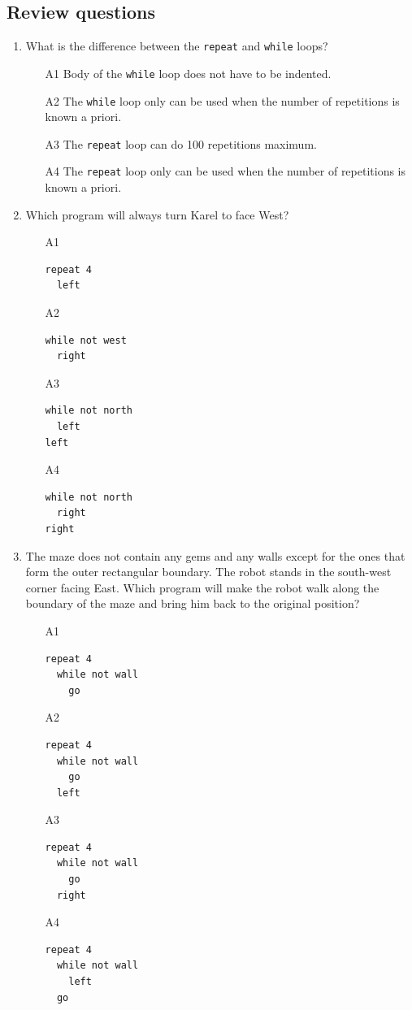 \documentclass[article,A4,12pt]{llncs}
\begin{document}
{{{{\subsection{Review questions}

\begin{enumerate}
\item What is the difference between the {\tt repeat} and {\tt while} loops?
\begin{enumerate}
\item[A1] Body of the {\tt while} loop does not have to be indented.
\item[A2] The {\tt while} loop only can be used when the number of repetitions is known a priori.
\item[A3] The {\tt repeat} loop can do 100 repetitions maximum.
\item[A4] The {\tt repeat} loop only can be used when the number of repetitions is known a priori.
\end{enumerate}
\item Which program will always turn Karel to face West?
\begin{enumerate}
\item[A1] 
\begin{verbatim}
repeat 4
  left
\end{verbatim}
\item[A2] 
\begin{verbatim}
while not west
  right
\end{verbatim}
\item[A3] 
\begin{verbatim}
while not north
  left
left
\end{verbatim}
\item[A4] 
\begin{verbatim}
while not north 
  right
right
\end{verbatim}
\end{enumerate}
\item The maze does not contain any gems and any walls except for the ones that form the outer rectangular boundary.
      The robot stands in the south-west corner facing East. Which program will make the robot walk along the 
      boundary of the maze and bring him back to the original position?
\begin{enumerate}
\item[A1] 
\begin{verbatim}
repeat 4
  while not wall
    go
\end{verbatim}
\item[A2] 
\begin{verbatim}
repeat 4
  while not wall
    go
  left
\end{verbatim}
\item[A3] 
\begin{verbatim}
repeat 4
  while not wall
    go
  right
\end{verbatim}
\item[A4] 
\begin{verbatim}
repeat 4
  while not wall
    left
  go
\end{verbatim}
\end{enumerate}
\end{enumerate}

}}}}
\end{document}
